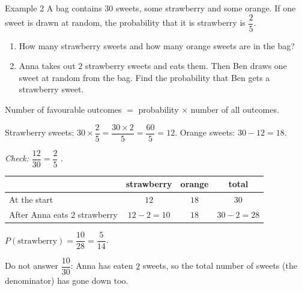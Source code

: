 \begin{exbox}{Example 2}
A bag contains $30$ sweets, some strawberry and some orange. If one sweet is drawn at random, the probability that it is strawberry is $\dfrac25$.
\begin{enumerate}[label=\alph*),leftmargin=1.5em,itemsep=0pt,topsep=2pt]
\item How many strawberry sweets and how many orange sweets are in the bag?
\item Anna takes out $2$ strawberry sweets and eats them. Then Ben draws one sweet at random from the bag. Find the probability that Ben gets a strawberry sweet.
\end{enumerate}
\guide
{}
\begin{recallbox}Number of favourable outcomes $=$ probability $\times$ number of all outcomes.\end{recallbox}
Strawberry sweets: $30\times\dfrac25=\dfrac{30\times 2}{5}=\dfrac{60}{5}=12$. Orange sweets: $30-12=18$.

\emph{Check:} $\dfrac{12}{30}=\dfrac{2}{5}$ \checkmark.
\begin{center}
\begin{tabular}{|l|c|c|c|}\hline
 & strawberry & orange & total \\ \hline
At the start & $12$ & $18$ & $30$\\ \hline
After Anna eats $2$ strawberry & $12-2=10$ & $18$ & $30-2=28$\\ \hline
\end{tabular}
\end{center}
$P(\text{strawberry})=\dfrac{10}{28}=\dfrac{5}{14}$.
\begin{warnbox}Do not answer $\dfrac{10}{30}$: Anna has eaten $2$ sweets, so the total number of sweets (the denominator) has gone down too.\end{warnbox}
\end{exbox}

